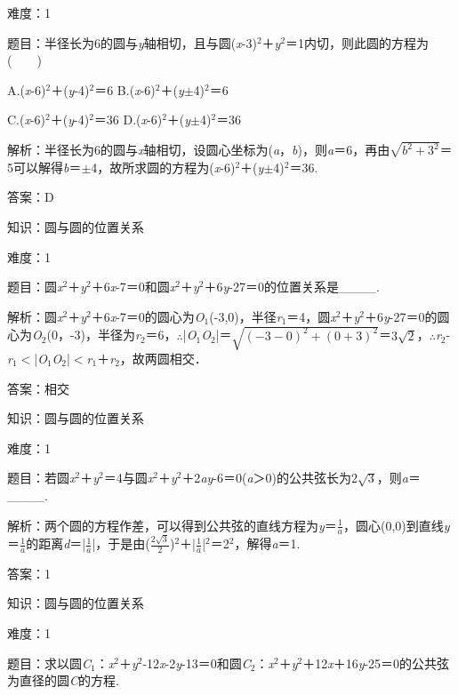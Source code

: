 \documentclass{article} %
\begin{document}
难度：1

题目：半径长为6的圆与\textit{y}轴相切，且与圆(\textit{x}-3)${}^{2}$＋\textit{y}${}^{2}$＝1内切，则此圆的方程为(　　)

A.(\textit{x}-6)${}^{2}$＋(\textit{y}-4)${}^{2}$＝6 B.(\textit{x}-6)${}^{2}$＋(\textit{y}$\mathrm{\pm}$4)${}^{2}$＝6

C.(\textit{x}-6)${}^{2}$＋(\textit{y}-4)${}^{2}$＝36 D.(\textit{x}-6)${}^{2}$＋(\textit{y}$\mathrm{\pm}$4)${}^{2}$＝36

解析：半径长为6的圆与\textit{x}轴相切，设圆心坐标为(\textit{a}，\textit{b})，则\textit{a}＝6，再由$\sqrt{b^2+3^2}$＝5可以解得\textit{b}＝$\mathrm{\pm}$4，故所求圆的方程为(\textit{x}-6)${}^{2}$＋(\textit{y}$\mathrm{\pm}$4)${}^{2}$＝36.

答案：D

知识：圆与圆的位置关系

难度：1

题目：圆\textit{x}${}^{2}$＋\textit{y}${}^{2}$＋6\textit{x}-7＝0和圆\textit{x}${}^{2}$＋\textit{y}${}^{2}$＋6\textit{y}-27＝0的位置关系是\_\_\_\_.


解析：圆\textit{x}${}^{2}$＋\textit{y}${}^{2}$＋6\textit{x}-7＝0的圆心为\textit{O}${}_{1}$(-3,0)，半径\textit{r}${}_{1}$＝4，圆\textit{x}${}^{2}$＋\textit{y}${}^{2}$＋6\textit{y}-27＝0的圆心为\textit{O}${}_{2}$(0，-3)，半径为\textit{r}${}_{2}$＝6，$\mathrm{\therefore}$|\textit{O}${}_{1}$\textit{O}${}_{2}$|＝$\sqrt{(-3-0)^2+(0+3)^2}$＝$3\sqrt{2}$，$\mathrm{\therefore}$\textit{r}${}_{2}$-\textit{r}${}_{1}$$\mathrm{<}$|\textit{O}${}_{1}$\textit{O}${}_{2}$|$\mathrm{<}$\textit{r}${}_{1}$＋\textit{r}${}_{2}$，故两圆相交．

答案：相交

知识：圆与圆的位置关系

难度：1

题目：若圆\textit{x}${}^{2}$＋\textit{y}${}^{2}$＝4与圆\textit{x}${}^{2}$＋\textit{y}${}^{2}$＋2\textit{ay}-6＝0(\textit{a}＞0)的公共弦长为$2\sqrt{3}$，则\textit{a}＝\_\_\_\_.

解析：两个圆的方程作差，可以得到公共弦的直线方程为\textit{y}＝$\frac{1}{a}$，圆心(0,0)到直线\textit{y}＝$\frac{1}{a}$的距离\textit{d}＝|$\frac{1}{a}$|，于是由($\frac{2\sqrt{3}}{2}$)${}^{2}$＋|$\frac{1}{a}$|${}^{2}$＝2${}^{2}$，解得\textit{a}＝1.

答案：1

知识：圆与圆的位置关系

难度：1

题目：求以圆\textit{C}${}_{1}$：\textit{x}${}^{2}$＋\textit{y}${}^{2}$-12\textit{x}-2\textit{y}-13＝0和圆\textit{C}${}_{2}$：\textit{x}${}^{2}$＋\textit{y}${}^{2}$＋12\textit{x}＋16\textit{y}-25＝0的公共弦为直径的圆\textit{C}的方程.
\end{document}
